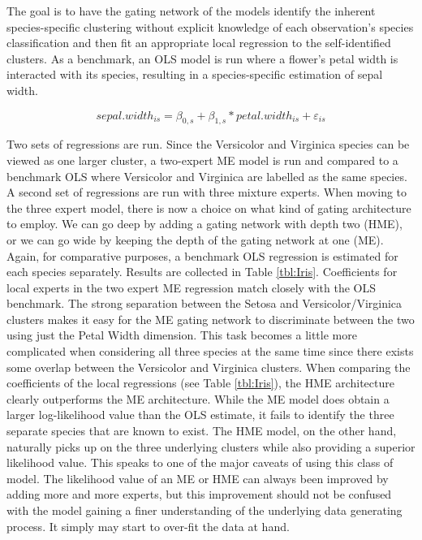 \documentclass[12pt]{article}
\begin{document}
The goal is to have the gating network of the 
models identify the inherent species-specific clustering without explicit
knowledge of each observation's species classification and then fit an
appropriate local regression to the self-identified clusters. As a benchmark,
an OLS model is run where a flower's petal width is interacted with its species,
resulting in a species-specific estimation of sepal width.

\begin{equation} \label{eq:OLS_iris}
    sepal.width_{is} = \beta_{0,s} + \beta_{1, s} * petal.width_{is} + \varepsilon_{is}
\end{equation}

Two sets of regressions are run. Since the Versicolor and Virginica species
can be viewed as one larger cluster, a two-expert ME model is run
and compared to a benchmark OLS where Versicolor and Virginica are labelled
as the same species. A second set of regressions are run with three mixture
experts. When moving to the three expert model, there is now a choice
on what kind of gating architecture to employ. We can go deep by adding 
a gating network with depth two (HME), or we can go wide by keeping the
depth of the gating network at one (ME). Again, for comparative purposes, a benchmark
OLS regression is estimated for each species separately. Results are collected in Table \ref{tbl:Iris}.
Coefficients for local experts in the two expert ME regression match closely with the OLS
benchmark. The strong separation between the Setosa and Versicolor/Virginica
clusters makes it easy for the ME gating network to discriminate between the two using
just the Petal Width dimension. This task becomes a little more complicated when
considering all three species at the same time since there exists some overlap
between the Versicolor and Virginica clusters. When comparing the coefficients of the
local regressions (see Table \ref{tbl:Iris}), the HME architecture clearly
outperforms the ME architecture. While the ME model does obtain a larger
log-likelihood value than the OLS estimate, it fails to identify the three
separate species that are known to exist. The HME model, on the other hand,
naturally picks up on the three underlying clusters while also providing a superior
likelihood value. This speaks to one of the major caveats of using this class of model.
The likelihood value of an ME or HME can always been improved by adding more and
more experts, but this improvement should not be confused with the model gaining a
finer understanding of the underlying data generating process. It simply may start to
over-fit the data at hand.
\end{document}
